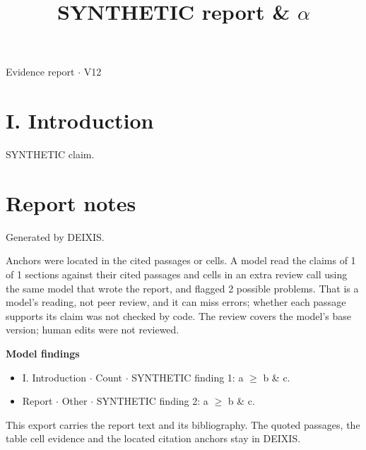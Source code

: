 \documentclass[journal]{IEEEtran}
\begin{document}
\title{SYNTHETIC report \& \ensuremath{\alpha}}

\maketitle

\noindent Evidence report \ensuremath{\cdot} V12

\section*{I. Introduction}

SYNTHETIC claim. \cite{Synth26}

\section*{Report notes}

Generated by DEIXIS.

Anchors were located in the cited passages or cells. A model read the claims of 1 of 1 sections against their cited passages and cells in an extra review call using the same model that wrote the report, and flagged 2 possible problems. That is a model’s reading, not peer review, and it can miss errors; whether each passage supports its claim was not checked by code. The review covers the model's base version; human edits were not reviewed.

\noindent\textbf{Model findings}

\begin{itemize}
\item I. Introduction \ensuremath{\cdot} Count \ensuremath{\cdot} SYNTHETIC finding 1: a \ensuremath{\geq} b \& c.
\item Report \ensuremath{\cdot} Other \ensuremath{\cdot} SYNTHETIC finding 2: a \ensuremath{\geq} b \& c.
\end{itemize}

This export carries the report text and its bibliography. The quoted passages, the table cell evidence and the located citation anchors stay in DEIXIS.




\end{document}

